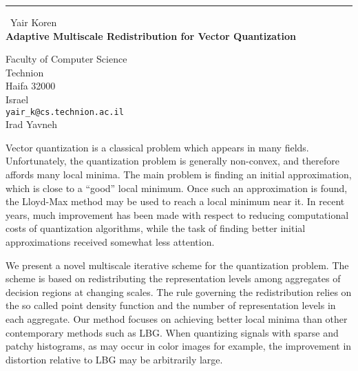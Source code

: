 \documentclass{report}
\begin{document}
\begin{center}
\rule{6in}{1pt} \
{\large Yair Koren \\
{\bf Adaptive Multiscale Redistribution for Vector Quantization}}

Faculty of Computer Science \\ Technion \\ Haifa 32000 \\ Israel
\\
{\tt yair\_k@cs.technion.ac.il}\\
Irad Yavneh\end{center}

Vector quantization is a classical problem which appears in many
fields. Unfortunately, the quantization problem is generally
non-convex, and therefore affords many local minima. The main
problem is finding an initial approximation, which is close to a
``good'' local minimum. Once such an approximation is found, the
Lloyd-Max method may be used to reach a local minimum near it. In
recent years, much improvement has been made with respect to
reducing computational costs of quantization algorithms, while the
task of finding better initial approximations received somewhat
less attention.

We present a novel multiscale iterative scheme for
the quantization problem. The scheme is based on redistributing
the representation levels among aggregates of decision regions at
changing scales. The rule governing the redistribution relies on
the so called point density function and the number of
representation levels in each aggregate. Our method focuses on
achieving better local minima than other contemporary methods such
as LBG. When quantizing signals with sparse and patchy histograms,
as may occur in color images for example, the improvement in
distortion relative to LBG may be arbitrarily large.
\end{document}
